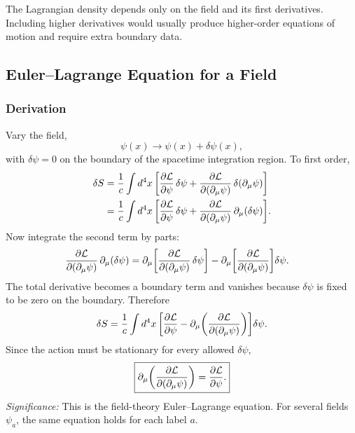 The Lagrangian density depends only on the field and its first derivatives. Including
higher derivatives would usually produce higher-order equations of motion and require
extra boundary data.

\subsection{Euler--Lagrange Equation for a Field}
\label{subsec:lec22:euler-lagrange}

\subsubsection*{Derivation}
Vary the field,
\begin{equation}\label{eq:lec22:field-variation}
  \psi(x)\to \psi(x)+\delta\psi(x),
\end{equation}
with $\delta\psi=0$ on the boundary of the spacetime integration region. To first
order,
\begin{align}
  \delta S
  &= \frac{1}{c}\int d^4x\,
     \qty[
       \pdv{\mathcal{L}}{\psi}\,\delta\psi
       + \pdv{\mathcal{L}}{(\partial_\mu\psi)}\,\delta(\partial_\mu\psi)
     ] \notag\\
  &= \frac{1}{c}\int d^4x\,
     \qty[
       \pdv{\mathcal{L}}{\psi}\,\delta\psi
       + \pdv{\mathcal{L}}{(\partial_\mu\psi)}\,\partial_\mu(\delta\psi)
     ].
  \label{eq:lec22:variation-before-parts}
\end{align}
Now integrate the second term by parts:
\begin{align}
  \pdv{\mathcal{L}}{(\partial_\mu\psi)}\,\partial_\mu(\delta\psi)
  &=
  \partial_\mu\qty[
    \pdv{\mathcal{L}}{(\partial_\mu\psi)}\,\delta\psi
  ]
  -
  \partial_\mu\qty[
    \pdv{\mathcal{L}}{(\partial_\mu\psi)}
  ]\delta\psi.
  \label{eq:lec22:parts-identity}
\end{align}
The total derivative becomes a boundary term and vanishes because $\delta\psi$ is fixed
to be zero on the boundary. Therefore
\begin{equation}\label{eq:lec22:variation-after-parts}
  \delta S
  = \frac{1}{c}\int d^4x\,
    \qty[
      \pdv{\mathcal{L}}{\psi}
      - \partial_\mu\qty(\pdv{\mathcal{L}}{(\partial_\mu\psi)})
    ]\delta\psi.
\end{equation}
Since the action must be stationary for every allowed $\delta\psi$,
\begin{equation}\label{eq:lec22:field-euler-lagrange}
  \boxed{
  \partial_\mu\qty(\pdv{\mathcal{L}}{(\partial_\mu\psi)})
  =
  \pdv{\mathcal{L}}{\psi}.}
\end{equation}
\textit{Significance:} This is the field-theory Euler--Lagrange equation. For several
fields $\psi_a$, the same equation holds for each label $a$.

